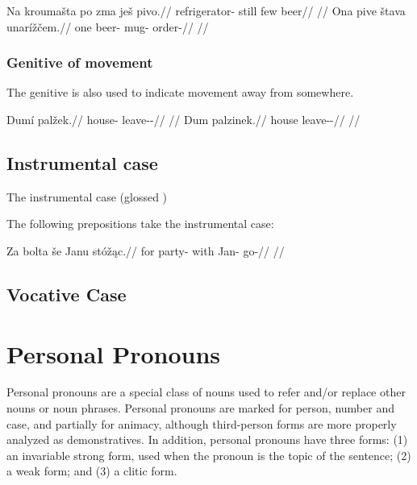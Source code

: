 \pex
\a
\begingl
\gla Na kroumašta po zma ješ pivo.//
\glb \Loc{} refrigerator-\Pat{} still few  beer//
\glft {}//
\endgl
\a
\begingl
\gla Ona pive štava unarížčem.//
\glb one beer-\Gen{} mug-\Pat{} order-//
\glft {}//
\endgl
\xe

\subsubsection{Genitive of movement}

The genitive is also used to indicate movement away from somewhere.

\pex
\a
\begingl
\gla Dumí palžek.//
\glb house-\Gen{} leave-\Av{}-\Pf{}//
\glft {}//
\endgl
\a
\begingl
\gla Dum palzinek.//
\glb house leave-\Pv{}-\Pf{}//
\glft {}//
\endgl
\xe

\subsection{Instrumental case}

The instrumental case (glossed \Ins{})

The following prepositions take the instrumental case:  

\pex
\begingl
\gla Za bolta še Janu stóž\k{a}c.//
\glb for party-\Pat{} with Jan-\Ins{} go-//
\glft {}//
\endgl
\xe


\subsection{Vocative Case}



\section{Personal Pronouns}

Personal pronouns are a special class of nouns used to refer and/or replace other nouns or noun phrases. Personal pronouns are marked for person, number and case, and partially for animacy, although third-person forms are more properly analyzed as demonstratives. In addition, personal pronouns have three forms: (1) an invariable strong form, used when the pronoun is the topic of the sentence; (2) a weak form; and (3) a clitic form.


